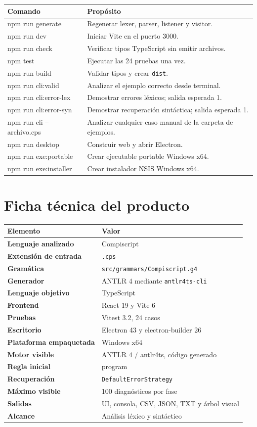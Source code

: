 \documentclass[12pt,letterpaper,oneside]{report}
\newcommand{\archivo}[1]{\texttt{#1}}
\newcommand{\regla}[1]{\textsf{#1}}
\newcommand{\cps}{\texttt{.cps}}
\begin{document}
\begin{tabularx}{\textwidth}{>{\ttfamily}l X}
\toprule
Comando & Propósito \\
\midrule
npm run generate & Regenerar lexer, parser, listener y visitor. \\
npm run dev & Iniciar Vite en el puerto 3000. \\
npm run check & Verificar tipos TypeScript sin emitir archivos. \\
npm test & Ejecutar las 24 pruebas una vez. \\
npm run build & Validar tipos y crear \archivo{dist}. \\
npm run cli:valid & Analizar el ejemplo correcto desde terminal. \\
npm run cli:error-lex & Demostrar errores léxicos; salida esperada 1. \\
npm run cli:error-syn & Demostrar recuperación sintáctica; salida esperada 1. \\
npm run cli -- archivo.cps & Analizar cualquier caso manual de la carpeta de ejemplos. \\
npm run desktop & Construir web y abrir Electron. \\
npm run exe:portable & Crear ejecutable portable Windows x64. \\
npm run exe:installer & Crear instalador NSIS Windows x64. \\
\bottomrule
\end{tabularx}

\chapter{Ficha técnica del producto}

\begin{tabularx}{\textwidth}{>{\bfseries}l X}
\toprule
Elemento & Valor \\
\midrule
Lenguaje analizado & Compiscript \\
Extensión de entrada & \cps \\
Gramática & \archivo{src/grammars/Compiscript.g4} \\
Generador & ANTLR 4 mediante \archivo{antlr4ts-cli} \\
Lenguaje objetivo & TypeScript \\
Frontend & React 19 y Vite 6 \\
Pruebas & Vitest 3.2, 24 casos \\
Escritorio & Electron 43 y electron-builder 26 \\
Plataforma empaquetada & Windows x64 \\
Motor visible & ANTLR 4 / antlr4ts, código generado \\
Regla inicial & \regla{program} \\
Recuperación & \archivo{DefaultErrorStrategy} \\
Máximo visible & 100 diagnósticos por fase \\
Salidas & UI, consola, CSV, JSON, TXT y árbol visual \\
Alcance & Análisis léxico y sintáctico \\
\bottomrule
\end{tabularx}
\end{document}
